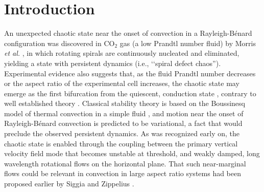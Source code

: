 \documentclass[preprint,prx,floatfix]{revtex4-1}
\begin{document}

\maketitle


\section{Introduction}

An unexpected chaotic state near the onset of convection in a Rayleigh-B\'enard configuration was discovered in CO$_{2}$ gas (a low Prandtl number fluid) by Morris \textit{et al.} \cite{morris1993spiral}, in which rotating spirals are continuously nucleated and eliminated, yielding a state with persistent dynamics (i.e., \lq\lq spiral defect chaos''). Experimental evidence also suggests that, as the fluid Prandtl number decreases or the aspect ratio of the experimental cell increases, the chaotic state may emerge as the first bifurcation from the quiescent, conduction state \cite{re:liu96}, contrary to well established theory \cite{re:busse78,re:chandrasekhar81,re:cross93}. Classical stability theory is based on the Boussinesq model of thermal convection in a simple fluid \cite{re:chandrasekhar81}, and motion near the onset of Rayleigh-B\'enard convection is predicted to be variational, a fact that would preclude the observed persistent dynamics. As was recognized early on, the chaotic state is enabled through the coupling between the primary vertical velocity field mode that becomes unstable at threshold, and weakly damped, long wavelength rotational flows on the horizontal plane. That such near-marginal flows could be relevant in convection in large aspect ratio systems had been proposed earlier by Siggia and Zippelius \cite{siggia1981dynamics}.
\end{document}
